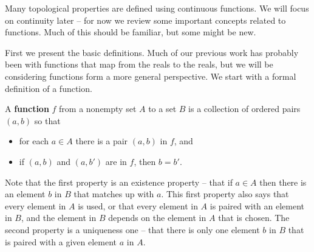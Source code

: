 \label{sec:functions}


\vspace*{-17 pt}

\vspace*{13 pt}


Many topological properties are defined using continuous functions. We will focus on continuity later -- for now we review some important concepts related to functions. Much of this should be familiar, but some might be new. 

First we present the basic definitions. Much of our previous work has probably been with functions that map from the reals to the reals, but we will be considering functions form a more general perspective. We start with a formal definition of a function. 

\begin{definition} \label{def:function} A \textbf{function} $f$ from a nonempty set $A$ to a set $B$ is a collection of ordered pairs $(a,b)$ so that 
\begin{itemize}
\item for each $a \in A$ there is a pair $(a,b)$ in $f$, and 
\item if $(a,b)$ and $(a,b')$ are in $f$, then $b=b'$.  
\end{itemize}
\end{definition}

Note that the first property is an existence property -- that if $a \in A$ then there is an element $b$ in $B$ that matches up with $a$. This first property also says that every element in $A$ is used, or that every element in $A$ is paired with an element in $B$, and the element in $B$ depends on the element in $A$ that is chosen. The second property is a uniqueness one -- that there is only one element $b$ in $B$ that is paired with a given element $a$ in $A$. 

